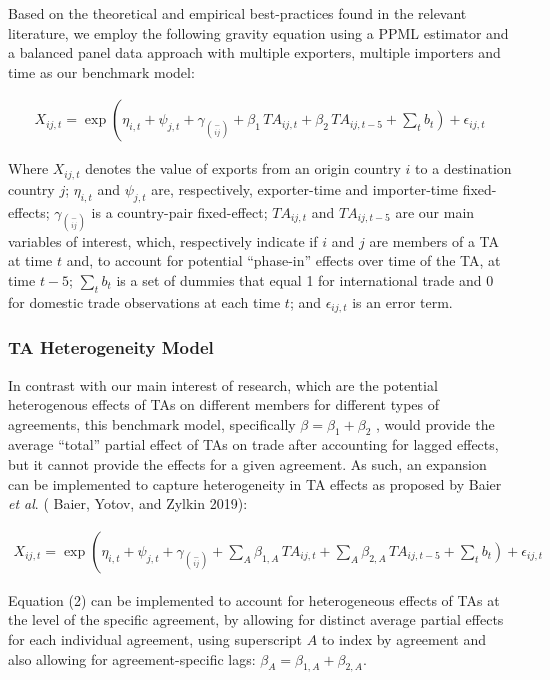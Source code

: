 \documentclass[12pt]{article}%
\begin{document}
%
Based on the theoretical and empirical best-practices found in the
relevant literature, we employ the following gravity equation using a
PPML estimator and a balanced panel data approach with multiple
exporters, multiple importers and time as our benchmark model:

\begin{multline}
    X_{ij,t} = \exp\left(\eta_{i,t} + \psi_{j,t} + \gamma_{\binom{-}{ij}} + \beta_{1} \, TA_{ij,t} \right. + \beta_{2} \, TA_{ij,t-5} + \left. \sum_{t} b_{t} \right) + \epsilon_{ij,t}
\end{multline}

Where \(X_{ij,t}\) denotes the value of exports from an origin country
\(i\) to a destination country \(j\); \(\eta_{i,t}\) and \(\psi_{j,t}\)
are, respectively, exporter-time and importer-time fixed-effects;
\(\gamma_{\binom{-}{ij}}\) is a country-pair fixed-effect;
\({TA}_{ij,t}\) and \({TA}_{ij,t - 5}\) are our main variables of
interest, which, respectively indicate if \(i\) and \(j\) are members of
a TA at time \(t\) and, to account for potential ``phase-in'' effects
over time of the TA, at time \(t - 5\); \(\sum_{t}^{}b_{t}\) is a set of
dummies that equal 1 for international trade and 0 for domestic trade
observations at each time \(t\); and \(\epsilon_{ij,t}\) is an error
term.%
\subsubsection{TA Heterogeneity Model}%
\label{ssubsec:TAHeterogeneityModel}%

%
In contrast with our main interest of research, which are the potential
heterogenous effects of TAs on different members for different types of
agreements, this benchmark model, specifically
\(\beta = \beta_{1} + \beta_{2}\) , would provide the average ``total''
partial effect of TAs on trade after accounting for lagged effects, but
it cannot provide the effects for a given agreement. As such, an
expansion can be implemented to capture heterogeneity in TA effects as
proposed by Baier \emph{et al}. (\cite{baier_widely_2019} Baier, Yotov, and Zylkin 2019):

\begin{multline}
    X_{ij,t} = \exp\left(\eta_{i,t} + \psi_{j,t} + \gamma_{\binom{-}{ij}} + \sum_{A} \beta_{1,A} \, TA_{ij,t} \right. + \sum_{A} \beta_{2,A} \, TA_{ij,t-5} + \left. \sum_{t} b_{t} \right) + \epsilon_{ij,t}
\end{multline}

Equation (2) can be implemented to account for heterogeneous effects of
TAs at the level of the specific agreement, by allowing for distinct
average partial effects for each individual agreement, using superscript
\(A\) to index by agreement and also allowing for agreement-specific
lags: \(\beta_{A} = \beta_{1,A} + \beta_{2,A}\).%
\end{document}

